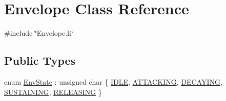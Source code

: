 \hypertarget{class_envelope}{}\section{Envelope Class Reference}
\label{class_envelope}


{\ttfamily \#include \char`\"{}Envelope.\+h\char`\"{}}

\subsection*{Public Types}
\begin{DoxyCompactItemize}
\item 
enum \hyperlink{class_envelope_a16c15d3d555a1a27869f48696f430d5f}{Env\+State} \+: unsigned char \{ \newline
\hyperlink{class_envelope_a16c15d3d555a1a27869f48696f430d5fab143de029e25fdce311f70afa35e5543}{I\+D\+LE}, 
\hyperlink{class_envelope_a16c15d3d555a1a27869f48696f430d5fa95ea9b4e93c89d0cdd585c8722fbfe5b}{A\+T\+T\+A\+C\+K\+I\+NG}, 
\hyperlink{class_envelope_a16c15d3d555a1a27869f48696f430d5fa6aebe1557244f4bfb6ab954708bf03c1}{D\+E\+C\+A\+Y\+I\+NG}, 
\hyperlink{class_envelope_a16c15d3d555a1a27869f48696f430d5fae13513569233289e2ed7756092794956}{S\+U\+S\+T\+A\+I\+N\+I\+NG}, 
\newline
\hyperlink{class_envelope_a16c15d3d555a1a27869f48696f430d5faace0b1e9ab9462b2c680c7203c98ef0e}{R\+E\+L\+E\+A\+S\+I\+NG}
 \}
\end{DoxyCompactItemize}

